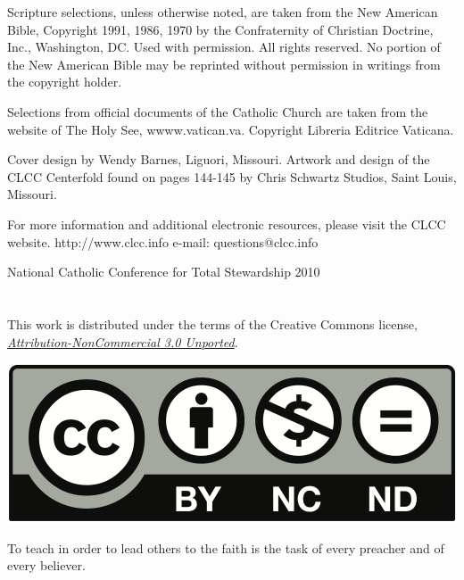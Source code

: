 \documentclass[oneside]{book}
\begin{document}
Scripture selections, unless otherwise noted, are taken from the New American
Bible, Copyright 1991, 1986, 1970 by the Confraternity of Christian Doctrine,
Inc., Washington, DC. Used with permission. All rights reserved. No portion of
the New American Bible may be reprinted without permission in writings from the
copyright holder.

Selections from official documents of the Catholic Church are taken from the
website of The Holy See, wwww.vatican.va. Copyright Libreria Editrice Vaticana.

Cover design by Wendy Barnes, Liguori, Missouri. Artwork and design of the CLCC
Centerfold found on pages 144-145 by Chris Schwartz Studios, Saint Louis,
Missouri.

For more information and additional electronic resources, please visit the CLCC
website.  http://www.clcc.info e-mail: questions@clcc.info

National Catholic Conference for Total Stewardship 2010

\section*{} 

\begin{center}

This work is distributed under the terms of the Creative Commons license,
\emph{\href{https://creativecommons.org/licenses/by-nc/3.0/us/legalcode}{
Attribution-NonCommercial 3.0 Unported}}.

\href{https://creativecommons.org/licenses/by-nc/3.0/us/}{
  \includegraphics[scale=0.4]{by-nc-nd}
}

\end{center}


To teach in order to lead others to the faith is the task of every preacher and
of every believer.
\end{document}
